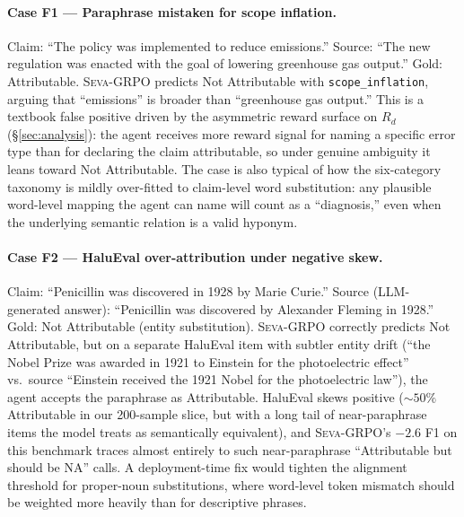 \documentclass{article}
\newcommand{\seva}{\textsc{Seva}\xspace}
\begin{document}
\paragraph{Case F1 --- Paraphrase mistaken for scope inflation.}
Claim: ``The policy was implemented to reduce emissions.''
Source: ``The new regulation was enacted with the goal of lowering greenhouse gas output.''
Gold: Attributable.
\seva-GRPO predicts Not Attributable with \texttt{scope\_inflation}, arguing that ``emissions'' is broader than ``greenhouse gas output.''
This is a textbook false positive driven by the asymmetric reward surface on $R_d$ (\S\ref{sec:analysis}): the agent receives more reward signal for naming a specific error type than for declaring the claim attributable, so under genuine ambiguity it leans toward Not Attributable.
The case is also typical of how the six-category taxonomy is mildly over-fitted to claim-level word substitution: any plausible word-level mapping the agent can name will count as a ``diagnosis,'' even when the underlying semantic relation is a valid hyponym.

\paragraph{Case F2 --- HaluEval over-attribution under negative skew.}
Claim: ``Penicillin was discovered in 1928 by Marie Curie.''
Source (LLM-generated answer): ``Penicillin was discovered by Alexander Fleming in 1928.''
Gold: Not Attributable (entity substitution).
\seva-GRPO correctly predicts Not Attributable, but on a separate HaluEval item with subtler entity drift (``the Nobel Prize was awarded in 1921 to Einstein for the photoelectric effect'' vs.\ source ``Einstein received the 1921 Nobel for the photoelectric law''), the agent accepts the paraphrase as Attributable.
HaluEval skews positive ($\sim$$50\%$ Attributable in our 200-sample slice, but with a long tail of near-paraphrase items the model treats as semantically equivalent), and \seva-GRPO's $-2.6$ F1 on this benchmark traces almost entirely to such near-paraphrase ``Attributable but should be NA'' calls.
A deployment-time fix would tighten the alignment threshold for proper-noun substitutions, where word-level token mismatch should be weighted more heavily than for descriptive phrases.
\end{document}
